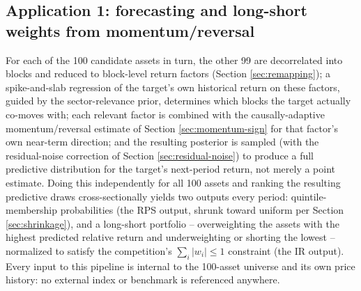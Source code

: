 \documentclass[11pt]{article}
\begin{document}
\subsection{Application 1: forecasting and long-short weights from momentum/reversal}
For each of the 100 candidate assets in turn, the other 99 are decorrelated
into blocks and reduced to block-level return factors (Section
\ref{sec:remapping}); a spike-and-slab regression of the target's own
historical return on these factors, guided by the sector-relevance prior,
determines which blocks the target actually co-moves with; each relevant
factor is combined with the causally-adaptive momentum/reversal estimate of
Section \ref{sec:momentum-sign} for that factor's own near-term direction; and
the resulting posterior is sampled (with the residual-noise correction of
Section \ref{sec:residual-noise}) to produce a full predictive distribution
for the target's next-period return, not merely a point estimate. Doing this
independently for all 100 assets and ranking the resulting predictive draws
cross-sectionally yields two outputs every period: quintile-membership
probabilities (the RPS output, shrunk toward uniform per Section
\ref{sec:shrinkage}), and a long-short portfolio -- overweighting the assets
with the highest predicted relative return and underweighting or shorting the
lowest -- normalized to satisfy the competition's $\sum_i|w_i|\le 1$
constraint (the IR output). Every input to this pipeline is internal to the
100-asset universe and its own price history: no external index or benchmark
is referenced anywhere.
\end{document}
